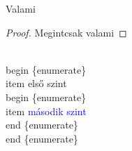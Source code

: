 \documentclass[aspectratio=169, 12pt, xcolor={table}]{beamer}
\begin{document}
\begin{frame}
\begin{theorem}
Valami
\end{theorem}

\begin{proof}
Megintcsak valami
\end{proof}

\begin{semiverbatim}
\\begin \{enumerate\}  \newline
\\item \alert{első szint}  \newline
\\begin \{enumerate\} \newline
\\item \textcolor{blue}{második szint} \newline
\\end \{enumerate\} \newline
\\end \{enumerate\}
\end{semiverbatim}
\end{frame}
\end{document}
